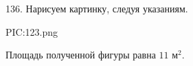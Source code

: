 136. Нарисуем картинку, следуя указаниям.
\begin{center}
{{PIC:123.png}}
\end{center}
Площадь полученной фигуры равна $11\text{ м}^2.$\\
